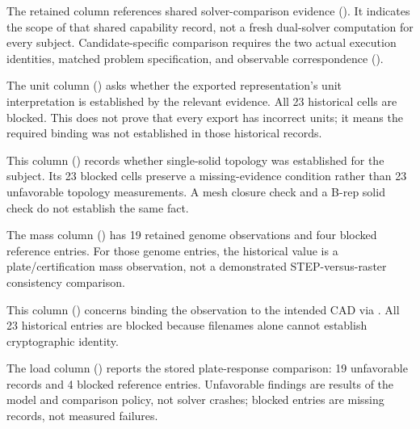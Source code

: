 The retained column references shared solver-comparison evidence (). It indicates the scope of that shared capability record, not a fresh dual-solver computation for every subject. Candidate-specific comparison requires the two actual execution identities, matched problem specification, and observable correspondence ().

The unit column () asks whether the exported representation's unit interpretation is established by the relevant evidence. All 23 historical cells are blocked. This does not prove that every export has incorrect units; it means the required binding was not established in those historical records.

This column () records whether single-solid topology was established for the subject. Its 23 blocked cells preserve a missing-evidence condition rather than 23 unfavorable topology measurements. A mesh closure check and a B-rep solid check do not establish the same fact.

The mass column () has 19 retained genome observations and four blocked reference entries. For those genome entries, the historical value is a plate/certification mass observation, not a demonstrated STEP-versus-raster consistency comparison.

This column () concerns binding the observation to the intended CAD via . All 23 historical entries are blocked because filenames alone cannot establish cryptographic identity.

The load column () reports the stored plate-response comparison: 19 unfavorable records and 4 blocked reference entries. Unfavorable findings are results of the model and comparison policy, not solver crashes; blocked entries are missing records, not measured failures.


